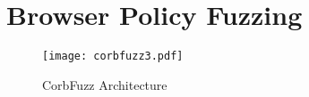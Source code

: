 \documentclass[10pt,conference]{IEEEtran}
\begin{document}





\section{Browser Policy Fuzzing}
\label{sec:methodology}

\begin{figure} [t] \small
    \centering
    \texttt{[image: corbfuzz3.pdf]}
    \caption{CorbFuzz Architecture}
    \label{fig: arch corbfuzz}
\end{figure}
\end{document}
